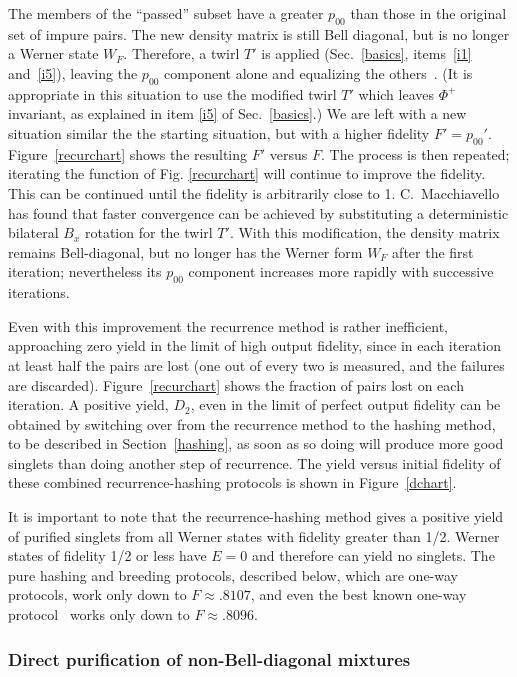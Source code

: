 The members of the ``passed'' subset have a greater $p_{00}$ than
those in the original set of impure pairs.  The new density matrix is
still Bell diagonal, but is no longer a Werner state $W_F$.
Therefore, a twirl $T'$ is applied (Sec.~\ref{basics}, items~\ref{i1}
and~\ref{i5}), leaving the $p_{00}$ component alone and equalizing the
others~\cite{foot5}.  (It is appropriate in this situation to use the
modified twirl $T'$ which leaves $\Phi^+$ invariant, as explained in item
\ref{i5} of Sec.~\ref{basics}.)  We are left with a new situation
similar the the starting situation, but with a higher fidelity
$F'=p_{00}'$.  Figure~\ref{recurchart} shows the resulting $F'$ versus
$F$.  The process is then repeated; iterating the function of
Fig. \ref{recurchart} will continue to improve the fidelity.  This can
be continued until the fidelity is arbitrarily close to 1.
C.~Macchiavello~\cite{foot5} has found that faster convergence can be
achieved by substituting a deterministic bilateral $B_x$ rotation for
the twirl $T'$.  With this modification, the density matrix remains
Bell-diagonal, but no longer has the Werner form $W_F$ after the first
iteration; nevertheless its $p_{00}$ component increases more rapidly
with successive iterations.
 
Even with this improvement the recurrence method is rather
inefficient, approaching zero yield in the limit of high output
fidelity, since in each iteration at least half the pairs are lost
(one out of every two is measured, and the failures are discarded).
Figure~\ref{recurchart} shows the fraction of pairs lost on each
iteration.  A positive yield, $D_2$, even in the limit of perfect output
fidelity can be obtained by switching over from the recurrence method
to the hashing method, to be described in Section~\ref{hashing}, as
soon as so doing will produce more good singlets than doing another
step of recurrence.  The yield versus initial fidelity of these
combined recurrence-hashing protocols is shown in Figure~\ref{dchart}.
 
It is important to note that the recurrence-hashing method gives a
positive yield of purified singlets from all Werner states with
fidelity greater than 1/2.  Werner states of fidelity 1/2 or less have
$E=0$ and therefore can yield no singlets.  The pure hashing and
breeding protocols, described below, which are one-way protocols, work
only down to $F\approx .8107$, and even the best known one-way
protocol~\cite{jumpthegun} works only down to $F\approx .8096$.
 
\subsubsection{Direct purification of non-Bell-diagonal mixtures}
\label{subsec:nonBell}

